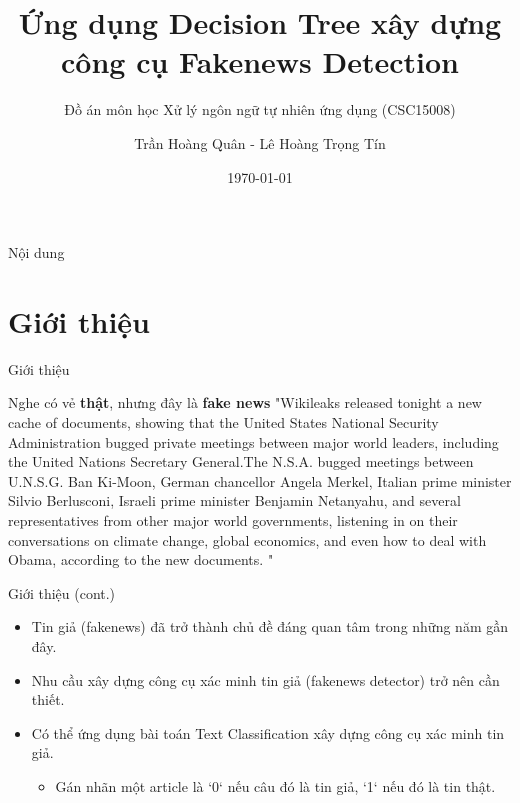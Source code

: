 \documentclass[aspectratio=169,xcolor=dvipsnames]{beamer}
\title[Fakenews Detection]{Ứng dụng Decision Tree xây dựng \\ công cụ Fakenews Detection} %
\subtitle{Đồ án môn học Xử lý ngôn ngữ tự nhiên ứng dụng (CSC15008)}
\author[Quan-Tran] {Trần Hoàng Quân - Lê Hoàng Trọng Tín}
\institute[HCMUS] %
{
    Khoa Công nghệ thông tin \\
    Trường Đại học Khoa học Tự nhiên - ĐHQG HCM %
}
\date{\today} %
\begin{document}
\begin{frame}
    \titlepage
\end{frame}

\begin{frame}{Nội dung}
    \tableofcontents
\end{frame}

\section{Giới thiệu}

\begin{frame}{Giới thiệu}
\begin{alertblock}{Nghe có vẻ \textbf{thật}, nhưng đây là \textbf{fake news}}
"Wikileaks released tonight a new cache of documents, showing that the United States  National Security Administration bugged private meetings between major world leaders, including the United Nations Secretary General.The N.S.A. bugged meetings between U.N.S.G. Ban Ki-Moon, German chancellor Angela Merkel, Italian prime minister Silvio Berlusconi, Israeli prime minister Benjamin Netanyahu, and several representatives from other major world governments, listening in on their conversations on climate change, global economics, and even  how to deal with Obama,  according to the new documents. "
\end{alertblock}
\end{frame}

\begin{frame}{Giới thiệu (cont.)}
\begin{itemize}
\item Tin giả (fakenews) đã trở thành chủ đề đáng quan tâm trong những năm gần đây.
\item Nhu cầu xây dựng công cụ xác minh tin giả (fakenews detector) trở nên cần thiết.
\item Có thể ứng dụng bài toán Text Classification xây dựng công cụ xác minh tin giả.
\begin{itemize}
    \item Gán nhãn một article là `0` nếu câu đó là tin giả, `1` nếu đó là tin thật.
\end{itemize}
\end{itemize}
\end{frame}
\end{document}
